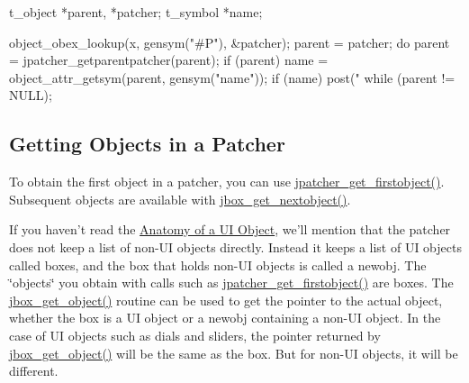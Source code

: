\begin{DoxyCode}
        t_object *parent, *patcher;
        t_symbol *name;

        object_obex_lookup(x, gensym("#P"), &patcher);
        parent = patcher;
        do {
            parent = jpatcher_getparentpatcher(parent);
            if (parent) {
                name = object_attr_getsym(parent, gensym("name"));
                if (name)
                    post("%
            }
        } while (parent != NULL);
\end{DoxyCode}
\hypertarget{chapter_scripting_chapter_scripting_knowing_objects}{}\subsection{Getting Objects in a Patcher}\label{chapter_scripting_chapter_scripting_knowing_objects}
To obtain the first object in a patcher, you can use \hyperlink{group__jpatcher_gafd77f63d504807973a4ce400c304b174}{jpatcher\_\-get\_\-firstobject()}. Subsequent objects are available with \hyperlink{group__jbox_ga89177ab12d45649c7209e65c97a3b128}{jbox\_\-get\_\-nextobject()}.

If you haven't read the \hyperlink{chapter_ui_anatomy}{Anatomy of a UI Object}, we'll mention that the patcher does not keep a list of non-\/UI objects directly. Instead it keeps a list of UI objects called boxes, and the box that holds non-\/UI objects is called a newobj. The \char`\"{}objects\char`\"{} you obtain with calls such as \hyperlink{group__jpatcher_gafd77f63d504807973a4ce400c304b174}{jpatcher\_\-get\_\-firstobject()} are boxes. The \hyperlink{group__jbox_ga5063d165cfca9dc76162ff5757ea4852}{jbox\_\-get\_\-object()} routine can be used to get the pointer to the actual object, whether the box is a UI object or a newobj containing a non-\/UI object. In the case of UI objects such as dials and sliders, the pointer returned by \hyperlink{group__jbox_ga5063d165cfca9dc76162ff5757ea4852}{jbox\_\-get\_\-object()} will be the same as the box. But for non-\/UI objects, it will be different.

